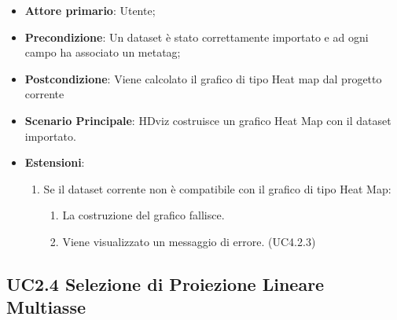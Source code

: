\begin{itemize}

    \item \textbf{Attore primario}: Utente;

	\item \textbf{Precondizione}:   Un dataset è stato correttamente importato e ad ogni campo 
									ha associato un metatag;

    \item \textbf{Postcondizione}:  Viene calcolato il grafico di tipo Heat map dal progetto corrente
	\item \textbf{Scenario Principale}: HDviz costruisce un grafico Heat Map con il dataset importato.
	\item \textbf{Estensioni}:
	\begin{enumerate}
		\item Se il dataset corrente non è compatibile con il grafico di tipo Heat Map:
		\begin{enumerate}
			\item La costruzione del grafico fallisce.
			\item Viene visualizzato un messaggio di errore. (UC4.2.3)
		\end{enumerate}
	\end{enumerate}
\end{itemize}


\subsection{UC2.4 Selezione di Proiezione Lineare Multiasse}

